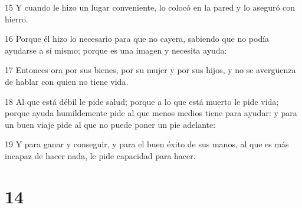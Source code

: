 \par 15 Y cuando le hizo un lugar conveniente, lo colocó en la pared y lo aseguró con hierro.
\par 16 Porque él hizo lo necesario para que no cayera, sabiendo que no podía ayudarse a sí mismo; porque es una imagen y necesita ayuda:
\par 17 Entonces ora por sus bienes, por su mujer y por sus hijos, y no se avergüenza de hablar con quien no tiene vida.
\par 18 Al que está débil le pide salud; porque a lo que está muerto le pide vida; porque ayuda humildemente pide al que menos medios tiene para ayudar: y para un buen viaje pide al que no puede poner un pie adelante:
\par 19 Y para ganar y conseguir, y para el buen éxito de sus manos, al que es más incapaz de hacer nada, le pide capacidad para hacer.

\chapter{14}

